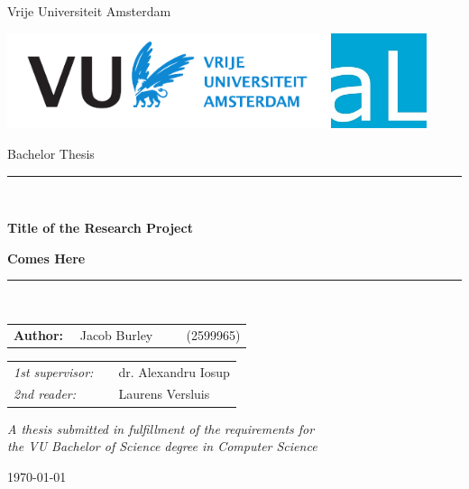 \documentclass[11pt]{article}
\begin{document}
\thispagestyle{empty}
\newcommand{\opendc}{OpenDC}

\begin{center}

Vrije Universiteit Amsterdam

\vspace{1mm}

\includegraphics[height=28mm]{vu-griffioen-white.pdf}
\includegraphics[height=28mm]{atLarge.jpg}

\vspace{1.5cm}

{\Large Bachelor Thesis}

\vspace*{1.5cm}

\rule{.9\linewidth}{.6pt}\\[0.4cm]
{\huge \bfseries Title of the Research Project\par}
{\huge \bfseries Comes Here\par}\vspace{0.4cm}
\rule{.9\linewidth}{.6pt}\\[1.5cm]

\vspace*{2mm}

{\Large
\begin{tabular}{l}
{\bf Author:} ~~Jacob Burley ~~~~ (2599965)
\end{tabular}
}

\vspace*{1.5cm}

\begin{tabular}{ll}
{\it 1st supervisor:}   & ~~dr. Alexandru Iosup \\
{\it 2nd reader:}       & ~~Laurens Versluis
\end{tabular}

\vspace*{2cm}

\textit{A thesis submitted in fulfillment of the requirements for\\ the VU Bachelor of Science degree in Computer Science}

\vspace*{1cm}

\today\\[4cm] %

\end{center}
\end{document}
